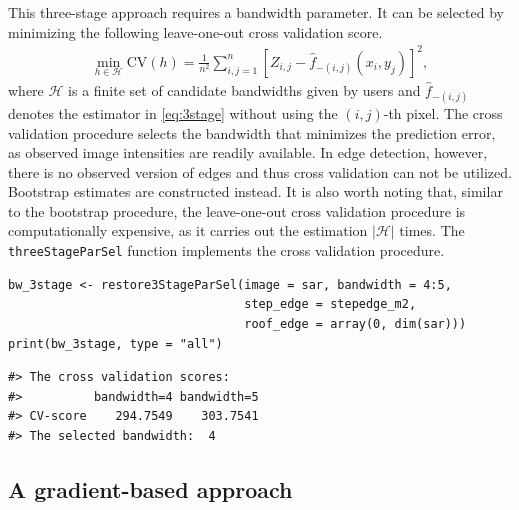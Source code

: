 This three-stage approach requires a bandwidth parameter. It can be selected by minimizing the following leave-one-out cross validation score.
\begin{align}
  \label{eq:loocv}
  \min_{h \in \mathscr{H}} \mathrm{CV}(h) = \frac{1}{n^2} \sum_{i, j = 1}^n \left[ Z_{i, j} - \widehat{f}_{-(i, j)}(x_i, y_j)\right]^2,
\end{align}
where \(\mathscr{H}\) is a finite set of candidate bandwidths given by users and \(\widehat{f}_{-(i, j)}\) denotes the estimator in \eqref{eq:3stage} without using the \((i, j)\)-th pixel. The cross validation procedure selects the bandwidth that minimizes the prediction error, as observed image intensities are readily available. In edge detection, however, there is no observed version of edges and thus cross validation can not be utilized. Bootstrap estimates are constructed instead. It is also worth noting that, similar to the bootstrap procedure, the leave-one-out cross validation procedure is computationally expensive, as it carries out the estimation \(|\mathscr{H}|\) times. The \texttt{threeStageParSel} function implements the cross validation procedure.

\begin{verbatim}
bw_3stage <- restore3StageParSel(image = sar, bandwidth = 4:5, 
                                 step_edge = stepedge_m2, 
                                 roof_edge = array(0, dim(sar)))
print(bw_3stage, type = "all")
\end{verbatim}

\begin{verbatim}
#> The cross validation scores:
#>          bandwidth=4 bandwidth=5
#> CV-score    294.7549    303.7541
#> The selected bandwidth:  4
\end{verbatim}

\subsection{A gradient-based approach}\label{sec:denoise.grad}

